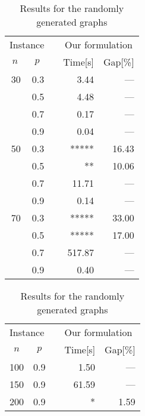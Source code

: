 \documentclass[11pt,a4paper]{article}
\begin{document}
\begin{table}[tb]
\caption{Results for the randomly generated graphs\label{tbl:smallRand}}
\begin{center}
{\small
\begin{tabular}{rrrrr}														
\toprule
\multicolumn{2}{l}{Instance}			&&	\multicolumn{2}{c}{Our formulation}\\ \cline{1-2} \cline{4-5}
\multicolumn{1}{c}{$n$}&\multicolumn{1}{c}{$p$}&&\multicolumn{1}{l}{Time[s]}&\multicolumn{1}{l}{Gap[\%]}\\
\midrule										
30	&	0.3	&&	3.44		&	---\\	
	&	0.5	&&	4.48		&	---\\
	&	0.7	&&	0.17		&	---\\	
	&	0.9	&&	0.04		&	---\\
\midrule
50	&	0.3	&&	*****	&	16.43	\\	
	&	0.5	&&	**		&	10.06\\
	&	0.7	&&	11.71		&	---\\	
	&	0.9	&&	0.14		&	---\\
\midrule														
70	&	0.3	&&	*****	&	33.00\\	
	&	0.5	&&	*****	&	17.00	\\
	&	0.7	&&	517.87	&	---\\	
	&	0.9	&&	0.40		&	---\\
\bottomrule
\end{tabular}	
}
\end{center}
\end{table}
\begin{table}[tb]
\caption{Results for the randomly generated graphs \label{tbl:middleRand}}
\begin{center}
{\small
\begin{tabular}{rrrrr}														
\toprule
\multicolumn{2}{l}{Instance}			&&	\multicolumn{2}{l}{Our formulation}\\ \cline{1-2} \cline{4-5}
\multicolumn{1}{c}{$n$}	&	\multicolumn{1}{c}{$p$}	&&	\multicolumn{1}{l}{Time[s]}	&	\multicolumn{1}{l}{Gap[\%]}	\\
\midrule										
100	&	0.9	&&	1.50		&	---\\	
150	&	0.9	&&	61.59	&	---\\								
200	&	0.9	&&	*		&	1.59\\	
\bottomrule
\end{tabular}	
}													
\end{center}
\end{table}
\end{document}
